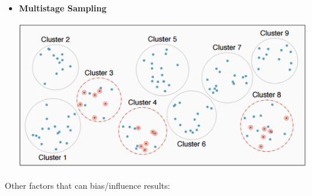 \documentclass[11pt,letterpaper,twoside]{article}
\begin{document}
\begin{itemize}
\item {\bf Multistage Sampling} \vspace{90pt}

\begin{center}
\includegraphics[scale=0.7]{images/multistage.png}
\end{center}

\end{itemize}

\newpage

Other factors that can bias/influence results:
\end{document}
